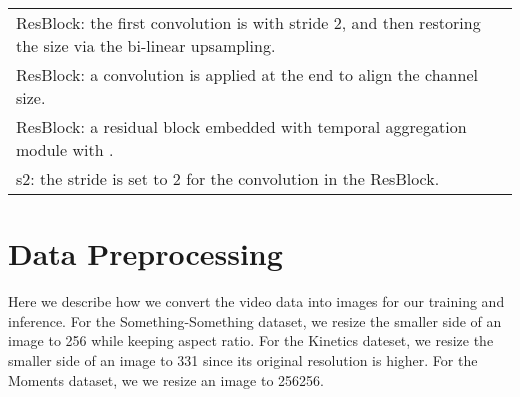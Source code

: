 \documentclass{article}
\begin{document}
\begin{table}[tbh]
\begin{tabular}{c|c|cc}
\bottomrule
\multicolumn{4}{l}{\footnotesize{ResBlock: the first  convolution is with stride 2, and then restoring the size via the bi-linear upsampling.}}\\
\multicolumn{4}{l}{\footnotesize{ResBlock: a  convolution is applied at the end to align the channel size.}}\\
\multicolumn{4}{l}{\footnotesize{ResBlock: a residual block embedded with temporal aggregation module with .}}\\
\multicolumn{4}{l}{\footnotesize{s2: the stride is set to 2 for the  convolution in the ResBlock.}}\\
\end{tabular}
\end{table}

\section{Data Preprocessing}
\label{sec:sup:datapre}
Here we describe how we convert the video data into images for our training and inference.
For the Something-Something dataset, we resize the smaller side of an image to 256 while keeping aspect ratio. For the Kinetics dateset, we resize the smaller side of an image to 331 since its original resolution is higher. For the Moments dataset, we we resize an image to 256256.

 
\end{document}
